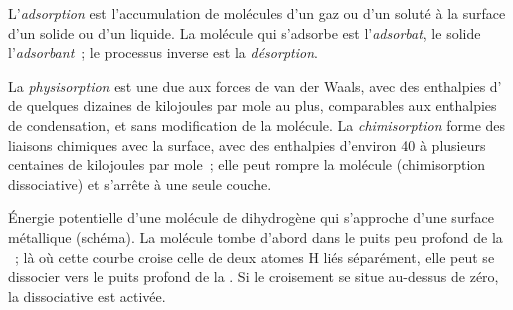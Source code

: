 \begin{definition}[Adsorption]\label{def:b3:surfaces-catalysis:adsorption}
L'\emph{adsorption} est l'accumulation de molécules d'un
gaz ou d'un soluté à la surface d'un solide ou d'un liquide. La molécule
qui s'adsorbe est l'\emph{adsorbat}, le solide
l'\emph{adsorbant}~;
le processus inverse est la \emph{désorption}.
\end{definition}

\begin{definition}\label{def:b3:surfaces-catalysis:physi-chemi}
La \emph{physisorption} est une  due aux
forces de van der Waals, avec des enthalpies d' de quelques
dizaines de kilojoules par mole au plus, comparables aux enthalpies de
condensation, et sans modification de la molécule. La
\emph{chimisorption} forme des liaisons chimiques
avec la surface, avec des enthalpies d'environ 40 à plusieurs centaines
de kilojoules par mole~; elle peut rompre la molécule (chimisorption
dissociative) et s'arrête à une seule couche.
\end{definition}

\begin{omfigure}

{\small Énergie potentielle d'une molécule de dihydrogène qui s'approche
d'une surface métallique (schéma). La molécule tombe d'abord dans le puits
peu profond de la ~; là où cette courbe croise celle de deux
atomes H liés séparément, elle peut se dissocier vers le puits profond
de la . Si le croisement se situe au-dessus de zéro, la
 dissociative est activée.}
\end{omfigure}

